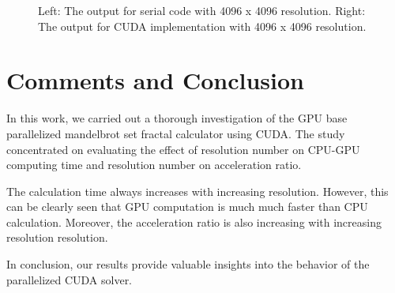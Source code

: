 \documentclass{article}
\begin{document}
\begin{figure}[hbt!]
\begin{subfigure}{0.42\textwidth}
\end{subfigure}
\caption{Left: The output for serial code with 4096 x 4096 resolution. Right: The output for CUDA implementation with 4096 x 4096 resolution.}
\label{figure_res_1}
\end{figure}
\FloatBarrier

\section{Comments and Conclusion}
In this work, we carried out a thorough investigation of the GPU base parallelized mandelbrot set fractal calculator using CUDA. The study concentrated on evaluating the effect of resolution number on CPU-GPU computing time and resolution number on acceleration ratio.  

The calculation time always increases with increasing resolution. However, this can be clearly seen that GPU computation is much much faster than CPU calculation. Moreover, the acceleration ratio is also increasing with increasing resolution resolution. 

In conclusion, our results provide valuable insights into the behavior of the parallelized CUDA solver. 



\clearpage
\printbibliography
\end{document}
